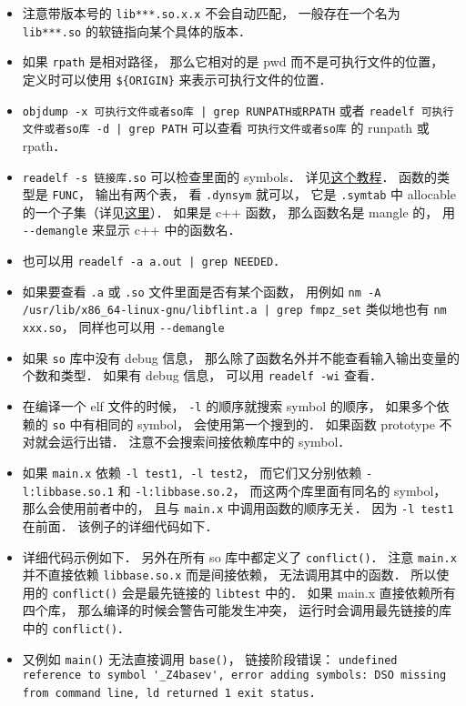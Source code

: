 \begin{itemize}
\item 注意带版本号的 \verb|lib***.so.x.x| 不会自动匹配， 一般存在一个名为 \verb|lib***.so| 的软链指向某个具体的版本．
\item 如果 \verb|rpath| 是相对路径， 那么它相对的是 pwd 而不是可执行文件的位置， 定义时可以使用 \verb|${ORIGIN}| 来表示可执行文件的位置．
\item \verb`objdump -x 可执行文件或者so库 | grep RUNPATH或RPATH` 或者 \verb`readelf 可执行文件或者so库 -d | grep PATH` 可以查看 \verb|可执行文件或者so库| 的 runpath 或 rpath．
\item \verb|readelf -s 链接库.so| 可以检查里面的 symbols． 详见\href{https://amir.rachum.com/blog/2016/09/17/shared-libraries/}{这个教程}． 函数的类型是 \verb|FUNC|， 输出有两个表， 看 \verb|.dynsym| 就可以， 它是 \verb|.symtab| 中 allocable 的一个子集（详见\href{https://blogs.oracle.com/solaris/post/inside-elf-symbol-tables}{这里}）． 如果是 c++ 函数， 那么函数名是 mangle 的， 用 \verb|--demangle| 来显示 c++ 中的函数名．
\item 也可以用 \verb`readelf -a a.out | grep NEEDED`．
\item 如果要查看 \verb|.a| 或 \verb|.so| 文件里面是否有某个函数， 用例如 \verb`nm -A /usr/lib/x86_64-linux-gnu/libflint.a | grep fmpz_set` 类似地也有 \verb|nm xxx.so|， 同样也可以用 \verb|--demangle|
\item 如果 \verb|so| 库中没有 debug 信息， 那么除了函数名外并不能查看输入输出变量的个数和类型． 如果有 debug 信息， 可以用 \verb|readelf -wi| 查看．
\item 在编译一个 elf 文件的时候， \verb|-l| 的顺序就搜索 symbol 的顺序， 如果多个依赖的 \verb|so| 中有相同的 symbol， 会使用第一个搜到的． 如果函数 prototype 不对就会运行出错． 注意不会搜索间接依赖库中的 symbol．
\item 如果 \verb|main.x| 依赖 \verb|-l test1, -l test2|， 而它们又分别依赖 \verb|-l:libbase.so.1| 和 \verb|-l:libbase.so.2|， 而这两个库里面有同名的 symbol， 那么会使用前者中的， 且与 \verb|main.x| 中调用函数的顺序无关． 因为 \verb|-l test1| 在前面． 该例子的详细代码如下．
\item 详细代码示例如下． 另外在所有 so 库中都定义了 \verb|conflict()|． 注意 \verb|main.x| 并不直接依赖 \verb|libbase.so.x| 而是间接依赖， 无法调用其中的函数． 所以使用的 \verb|conflict()| 会是最先链接的 \verb|libtest| 中的． 如果 main.x 直接依赖所有四个库， 那么编译的时候会警告可能发生冲突， 运行时会调用最先链接的库中的 \verb|conflict()|．
\item 又例如 \verb|main()| 无法直接调用 \verb|base()|， 链接阶段错误： \verb|undefined reference to symbol '_Z4basev', error adding symbols: DSO missing from command line, ld returned 1 exit status|．
\end{itemize}

